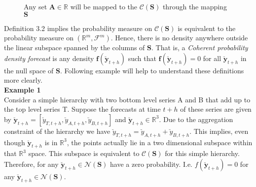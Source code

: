 \documentclass[a4paper, 11pt]{article}
\begin{document}
\usetikzlibrary{arrows,positioning,shapes,fit,calc}

\begin{figure}[H]
	\begin{center}
		\newline
	\end{center}
	\caption{Any set $\bm{A} \in \bm{\mathbb{R}}$ will be mapped to the $\mathscr{C}(\bm{S})$ through the mapping $\bm{S}$}
\end{figure}
\noindent
Definition 3.2 implies the probability measure on $\mathscr{C}(\bm{S})$ is equivalent to the probability measure on $(\bm{\mathbb{R}}^m, \bm{\mathscr{F}}^m)$. Hence, there is no density anywhere outside the linear subspace spanned by the columns of $\bm{S}$. That is, a \textit{Coherent probability density forecast} is any density $\bm{f}(\bm{\breve{y}}_{t+h})$ such that $\bm{f}(\bm{\breve{y}}_{t+h})=0$ for all $\bm{\breve{y}}_{t+h}$ in the null space of $\bm{S}$. Following example will help to understand these definitions more clearly.\\

\noindent
\textbf{Example 1}\\
\noindent
Consider a simple hierarchy with two bottom level series A and B that add up to the top level series T. Suppose the forecasts at time $t+h$ of these series are given by $\mathbold{\breve{y}}_{t+h} = [\breve{y}_{T,t+h},\breve{y}_{A,t+h}, \breve{y}_{B,t+h}]$ and $\mathbold{\breve{y}}_{t+h} \in \bm{\mathbb{R}}^3$. Due to the aggregation constraint of the hierarchy we have $\breve{y}_{T,t+h}=\breve{y}_{A,t+h}+\breve{y}_{B,t+h}$. This implies, even though  $\mathbold{\breve{y}}_{t+h}$ is in $\bm{\mathbb{R}}^3$, the points actually lie in a two dimensional subspace within that $\bm{\mathbb{R}}^3$ space. This subspace is equivalent to $\mathscr{C}(\bm{S})$ for this simple hierarchy. Therefore, for any $\mathbold{\breve{y}}_{t+h} \in \mathscr{N}(\bm{S})$ have a zero probability. I.e. $f(\mathbold{\breve{y}}_{t+h})=0$ for any $\mathbold{\breve{y}}_{t+h} \in \mathscr{N}(\bm{S})$.\\
\end{document}
